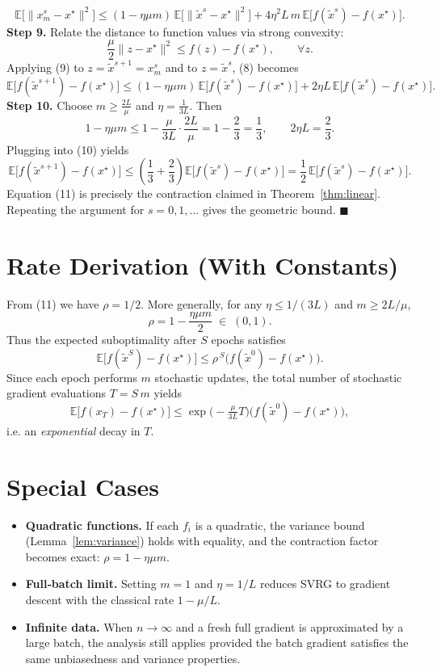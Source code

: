 \documentclass{article}
\begin{document}
\[
\mathbb{E}\!\bigl[\|x^{s}_{m}-x^{\star}\|^{2}\bigr]
\le (1-\eta\mu m)\,\mathbb{E}\!\bigl[\|\tilde{x}^{s}-x^{\star}\|^{2}\bigr]
   +4\eta^{2}L\,m\,\mathbb{E}\!\bigl[f(\tilde{x}^{s})-f(x^{\star})\bigr].
\tag{8}
\]
\noindent\textbf{Step 9.} Relate the distance to function values via strong convexity:
\[
\frac{\mu}{2}\|z-x^{\star}\|^{2}\le f(z)-f(x^{\star}),\qquad\forall z.
\tag{9}
\]
Applying (9) to $z=\tilde{x}^{s+1}=x^{s}_{m}$ and to $z=\tilde{x}^{s}$, (8) becomes
\[
\mathbb{E}\!\bigl[f(\tilde{x}^{s+1})-f(x^{\star})\bigr]
\le (1-\eta\mu m)\,\mathbb{E}\!\bigl[f(\tilde{x}^{s})-f(x^{\star})\bigr]
   +2\eta L\,\mathbb{E}\!\bigl[f(\tilde{x}^{s})-f(x^{\star})\bigr].
\tag{10}
\]
\noindent\textbf{Step 10.} Choose $m\ge\frac{2L}{\mu}$ and $\eta=\frac{1}{3L}$. Then
\[
1-\eta\mu m\le 1-\frac{\mu}{3L}\cdot\frac{2L}{\mu}=1-\frac{2}{3}= \frac{1}{3},
\qquad
2\eta L = \frac{2}{3}.
\]
Plugging into (10) yields
\[
\mathbb{E}\!\bigl[f(\tilde{x}^{s+1})-f(x^{\star})\bigr]
\le\left(\frac{1}{3}+\frac{2}{3}\right)\mathbb{E}\!\bigl[f(\tilde{x}^{s})-f(x^{\star})\bigr]
= \frac{1}{2}\,\mathbb{E}\!\bigl[f(\tilde{x}^{s})-f(x^{\star})\bigr].
\tag{11}
\]
Equation (11) is precisely the contraction claimed in Theorem~\ref{thm:linear}. Repeating the argument for $s=0,1,\dots$ gives the geometric bound.
\hfill $\blacksquare$

\section*{Rate Derivation (With Constants)}
From (11) we have $\rho=1/2$. More generally, for any $\eta\le 1/(3L)$ and $m\ge 2L/\mu$,
\[
\rho = 1-\frac{\eta\mu m}{2}\; \in\;(0,1).
\]
Thus the expected suboptimality after $S$ epochs satisfies
\[
\mathbb{E}\!\bigl[f(\tilde{x}^{S})-f(x^{\star})\bigr]
\le \rho^{\,S}\bigl(f(\tilde{x}^{0})-f(x^{\star})\bigr).
\]
Since each epoch performs $m$ stochastic updates, the total number of stochastic gradient evaluations $T=S\,m$ yields
\[
\mathbb{E}\!\bigl[f(x_T)-f(x^{\star})\bigr]
\le \exp\!\bigl(-\tfrac{\mu}{3L}T\bigr)\bigl(f(\tilde{x}^{0})-f(x^{\star})\bigr),
\]
i.e. an \emph{exponential} decay in $T$.

\section*{Special Cases}
\begin{itemize}
\item \textbf{Quadratic functions.} If each $f_i$ is a quadratic, the variance bound (Lemma~\ref{lem:variance}) holds with equality, and the contraction factor becomes exact: $\rho=1-\eta\mu m$.
\item \textbf{Full‑batch limit.} Setting $m=1$ and $\eta=1/L$ reduces SVRG to gradient descent with the classical rate $1-\mu/L$.
\item \textbf{Infinite data.} When $n\to\infty$ and a fresh full gradient is approximated by a large batch, the analysis still applies provided the batch gradient satisfies the same unbiasedness and variance properties.
\end{itemize}
\end{document}
